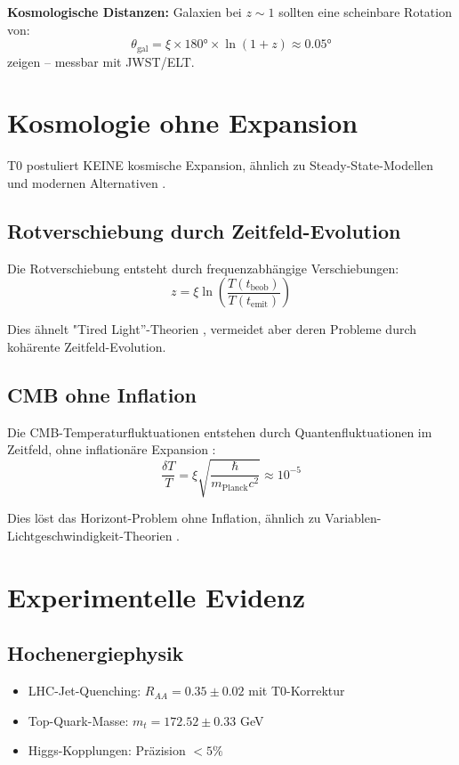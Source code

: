 	\textbf{Kosmologische Distanzen:}
	Galaxien bei $z \sim 1$ sollten eine scheinbare Rotation von:
	\begin{equation}
		\theta_{\text{gal}} = \xi \times 180° \times \ln(1+z) \approx 0.05°
	\end{equation}
	zeigen – messbar mit JWST/ELT.
	\section{Kosmologie ohne Expansion}
	
	T0 postuliert KEINE kosmische Expansion, ähnlich zu Steady-State-Modellen \cite{hoyle1948, bondi1948} und modernen Alternativen \cite{lopez2010, lerner2014}.
	
	\subsection{Rotverschiebung durch Zeitfeld-Evolution}
	
	Die Rotverschiebung entsteht durch frequenzabhängige Verschiebungen:
	\begin{equation}
		z = \xi \ln\left(\frac{T(t_{\text{beob}})}{T(t_{\text{emit}})}\right)
	\end{equation}
	
	Dies ähnelt "Tired Light''-Theorien \cite{zwicky1929}, vermeidet aber deren Probleme durch kohärente Zeitfeld-Evolution.
	
	\subsection{CMB ohne Inflation}
	
	Die CMB-Temperaturfluktuationen entstehen durch Quantenfluktuationen im Zeitfeld, ohne inflationäre Expansion \cite{pascher2025cmb}:
	\begin{equation}
		\frac{\delta T}{T} = \xi \sqrt{\frac{\hbar}{m_{\text{Planck}}c^2}} \approx 10^{-5}
	\end{equation}
	
	Dies löst das Horizont-Problem ohne Inflation, ähnlich zu Variablen-Lichtgeschwindigkeit-Theorien \cite{albrecht1999, barrow1999}.
	
	\section{Experimentelle Evidenz}
	
	\subsection{Hochenergiephysik}
	\begin{itemize}
		\item LHC-Jet-Quenching: $R_{AA} = 0.35 \pm 0.02$ mit T0-Korrektur \cite{cms2024, alice2023}
		\item Top-Quark-Masse: $m_t = 172.52 \pm 0.33$ GeV \cite{cms2023top}
		\item Higgs-Kopplungen: Präzision $< 5\%$ \cite{atlas2023higgs}
	\end{itemize}
	
